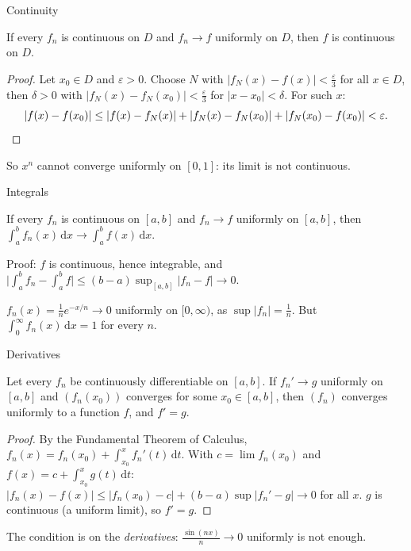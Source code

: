 \documentclass{wosm-slides}
\newcommand{\dx}{\,\mathrm{d}x}
\newcommand{\dt}{\,\mathrm{d}t}
\begin{document}
\begin{frame}{Continuity}
  \begin{theorem}
    If every $f_n$ is continuous on $D$ and $f_n \to f$ uniformly on $D$,
    then $f$ is continuous on $D$.
  \end{theorem}
  \pause
  \begin{proof}
    Let $x_0 \in D$ and $\varepsilon > 0$. Choose $N$ with $|f_N(x) - f(x)| < \frac\varepsilon3$
    for all $x \in D$, then $\delta > 0$ with $|f_N(x) - f_N(x_0)| < \frac\varepsilon3$ for
    $|x - x_0| < \delta$. For such $x$:
    \[ |f(x) - f(x_0)| \le |f(x) - f_N(x)| + |f_N(x) - f_N(x_0)| + |f_N(x_0) - f(x_0)|
       < \varepsilon . \qedhere \]
  \end{proof}
  \pause
  {\small So $x^n$ cannot converge uniformly on $[0, 1]$: its limit is not continuous.\par}
\end{frame}

\begin{frame}{Integrals}
  \begin{theorem}
    If every $f_n$ is continuous on $[a, b]$ and $f_n \to f$ uniformly on $[a, b]$, then
    $\int_a^b f_n(x)\dx \to \int_a^b f(x)\dx$.
  \end{theorem}
  {\small Proof: $f$ is continuous, hence integrable, and
  $\bigl|\int_a^b f_n - \int_a^b f\bigr| \le (b - a) \sup_{[a,b]} |f_n - f| \to 0$.\par}
  \pause
  \begin{warning}
    $f_n(x) = \frac1n e^{-x/n} \to 0$ uniformly on $[0, \infty)$, as $\sup |f_n| = \frac1n$.
    But $\int_0^\infty f_n(x)\dx = 1$ for every $n$.
  \end{warning}
\end{frame}

\begin{frame}{Derivatives}
  \begin{theorem}
    Let every $f_n$ be continuously differentiable on $[a, b]$. If $f_n' \to g$ uniformly on
    $[a, b]$ and $(f_n(x_0))$ converges for some $x_0 \in [a, b]$, then $(f_n)$ converges
    uniformly to a function $f$, and $f' = g$.
  \end{theorem}
  \pause
  \begin{proof}
    By the Fundamental Theorem of Calculus,
    $f_n(x) = f_n(x_0) + \int_{x_0}^{x} f_n'(t)\dt$.
    With $c = \lim f_n(x_0)$ and $f(x) = c + \int_{x_0}^x g(t)\dt$:
    $|f_n(x) - f(x)| \le |f_n(x_0) - c| + (b - a) \sup |f_n' - g| \to 0$ for all $x$.
    $g$ is continuous (a uniform limit), so $f' = g$.
  \end{proof}
  {\small The condition is on the \emph{derivatives}: $\frac{\sin(nx)}{n} \to 0$ uniformly is
  not enough.\par}
\end{frame}
\end{document}
